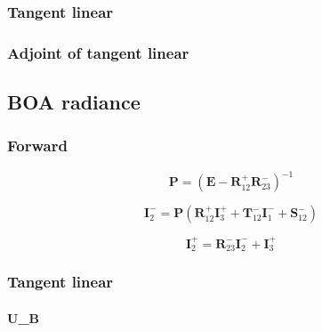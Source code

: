 \subsubsection{Tangent linear}
\label{sec:radiance-toa_radiance-tangent_linear}


\subsubsection{Adjoint of tangent linear}
\label{sec:radiance-toa_radiance-adjoint_of_tangent_linear}


%
\subsection{BOA radiance}
\label{sec:boa_radiance}

\subsubsection{Forward}
\label{sec:radiance-boa_radiance-forward}

\begin{equation}
\mathbf{P} = (\mathbf{E} - \mathbf{R}^{+}_{12}\mathbf{R}^{-}_{23})^{-1}
\label{eq:radiance-boa_radiance-forward_P}
\end{equation}

\begin{equation}
\mathbf{I}^{-}_{2} = \mathbf{P}(\mathbf{R}^{+}_{12}\mathbf{I}^{+}_{3} + \mathbf{T}^{-}_{12}\mathbf{I}^{-}_{1} + \mathbf{S}^{-}_{12})
\label{eq:radiance-boa_radiance-forward_I_m_2}
\end{equation}

\begin{equation}
\mathbf{I}^{+}_{2} = \mathbf{R}^{-}_{23}\mathbf{I}^{-}_{2} + \mathbf{I}^{+}_{3}
\label{eq:radiance-boa_radiance-forward_I_p_2}
\end{equation}


%
\subsubsection{Tangent linear}
\label{sec:radiance-boa_radiance-tangent_linear}

\paragraph{U\_B}
\label{sec:radiance-boa_radiance-tangent_linear-u_b}

